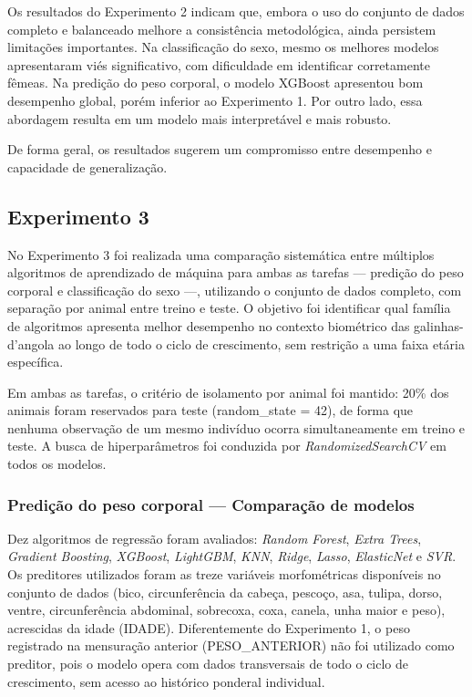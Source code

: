 \documentclass[12pt]{article}
\begin{document}
Os resultados do Experimento 2 indicam que, embora o uso do conjunto de dados
completo e balanceado melhore a consistência metodológica, ainda persistem
limitações importantes. Na classificação do sexo, mesmo os melhores modelos
apresentaram viés significativo, com dificuldade em identificar corretamente
fêmeas. Na predição do peso corporal, o modelo XGBoost apresentou bom
desempenho global, porém inferior ao Experimento 1. Por outro lado, essa abordagem
resulta em um modelo mais interpretável e mais robusto.

De forma geral, os resultados sugerem um compromisso entre desempenho e
capacidade de generalização.

\subsection{Experimento 3}

No Experimento 3 foi realizada uma comparação sistemática entre múltiplos
algoritmos de aprendizado de máquina para ambas as tarefas --- predição do peso
corporal e classificação do sexo ---, utilizando o conjunto de dados completo,
com separação por animal entre treino e teste. O objetivo foi identificar qual
família de algoritmos apresenta melhor desempenho no contexto biométrico das
galinhas-d'angola ao longo de todo o ciclo de crescimento, sem restrição a uma
faixa etária específica.

Em ambas as tarefas, o critério de isolamento por animal foi mantido: 20\% dos
animais foram reservados para teste (random\_state = 42), de forma que nenhuma
observação de um mesmo indivíduo ocorra simultaneamente em treino e teste. A
busca de hiperparâmetros foi conduzida por \textit{RandomizedSearchCV} em todos
os modelos.

\subsubsection{Predição do peso corporal --- Comparação de modelos}

Dez algoritmos de regressão foram avaliados: \textit{Random Forest},
\textit{Extra Trees}, \textit{Gradient Boosting}, \textit{XGBoost},
\textit{LightGBM}, \textit{KNN}, \textit{Ridge}, \textit{Lasso},
\textit{ElasticNet} e \textit{SVR}. Os preditores utilizados foram as treze
variáveis morfométricas disponíveis no conjunto de dados (bico, circunferência
da cabeça, pescoço, asa, tulipa, dorso, ventre, circunferência abdominal,
sobrecoxa, coxa, canela, unha maior e peso), acrescidas da idade (IDADE).
Diferentemente do Experimento 1, o peso registrado na mensuração anterior
(PESO\_ANTERIOR) não foi utilizado como preditor, pois o modelo opera com dados
transversais de todo o ciclo de crescimento, sem acesso ao histórico ponderal
individual.
\end{document}
